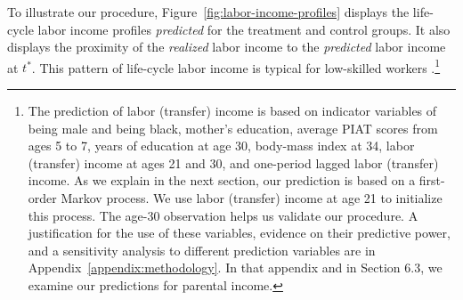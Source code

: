 To illustrate our procedure, Figure~\ref{fig:labor-income-profiles} displays the life-cycle labor income profiles \textit{predicted} for the treatment and control groups. It also displays the proximity of the \textit{realized} labor income to the \textit{predicted} labor income at $t^*$. This pattern of life-cycle labor income is typical for low-skilled workers \citep{Blundell-etal_2015_J-Pub-E,Gladden_Taber_2000_WageProgression,Sanders-Taber_2012_AR,Lagakos_Moll_etal_2016_LifeCycle_NBER}.\footnote{The prediction of labor (transfer) income is based on indicator variables of being male and being black, mother's education, average PIAT scores from ages 5 to 7, years of education at age 30, body-mass index at 34, labor (transfer) income at ages 21 and 30, and one-period lagged labor (transfer) income. As we explain in the next section, our prediction is based on a first-order Markov process. We use labor (transfer) income at age 21 to initialize this process. The age-30 observation helps us validate our procedure. A justification for the use of these variables, evidence on their predictive power, and a sensitivity analysis to different prediction variables are in Appendix~\ref{appendix:methodology}. In that appendix and in Section 6.3, we examine our predictions for parental income.}

